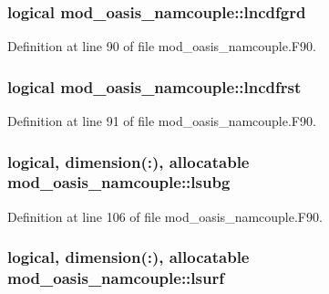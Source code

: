 \hypertarget{classmod__oasis__namcouple_a5d6add8b958acc8b865b898d9e54ac73}{
\subsubsection[{lncdfgrd}]{\setlength{\rightskip}{0pt plus 5cm}logical mod\+\_\+oasis\+\_\+namcouple\+::lncdfgrd\hspace{0.3cm}{\ttfamily [private]}}}\label{classmod__oasis__namcouple_a5d6add8b958acc8b865b898d9e54ac73}


Definition at line 90 of file mod\+\_\+oasis\+\_\+namcouple.\+F90.

\hypertarget{classmod__oasis__namcouple_a645168dae20a0c24786c3e6dcea9f2ab}{
\subsubsection[{lncdfrst}]{\setlength{\rightskip}{0pt plus 5cm}logical mod\+\_\+oasis\+\_\+namcouple\+::lncdfrst\hspace{0.3cm}{\ttfamily [private]}}}\label{classmod__oasis__namcouple_a645168dae20a0c24786c3e6dcea9f2ab}


Definition at line 91 of file mod\+\_\+oasis\+\_\+namcouple.\+F90.

\hypertarget{classmod__oasis__namcouple_acda1605129987d656360e1ed81e8d199}{
\subsubsection[{lsubg}]{\setlength{\rightskip}{0pt plus 5cm}logical, dimension(\+:), allocatable mod\+\_\+oasis\+\_\+namcouple\+::lsubg\hspace{0.3cm}{\ttfamily [private]}}}\label{classmod__oasis__namcouple_acda1605129987d656360e1ed81e8d199}


Definition at line 106 of file mod\+\_\+oasis\+\_\+namcouple.\+F90.

\hypertarget{classmod__oasis__namcouple_a902fe007f6c2505858bf72dbc64e43a2}{
\subsubsection[{lsurf}]{\setlength{\rightskip}{0pt plus 5cm}logical, dimension(\+:), allocatable mod\+\_\+oasis\+\_\+namcouple\+::lsurf\hspace{0.3cm}{\ttfamily [private]}}}\label{classmod__oasis__namcouple_a902fe007f6c2505858bf72dbc64e43a2}


